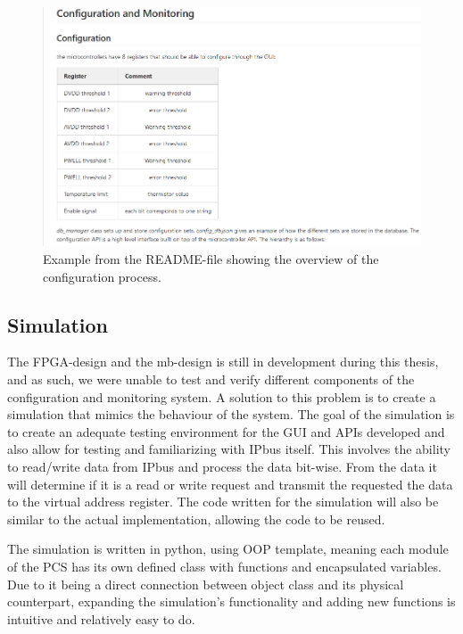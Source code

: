 \documentclass[main.tex]{subfiles}
\begin{document}
\begin{figure}[!ht]
    \centering
    \includegraphics[width=18cm]{images/README_example.png}
    \caption{Example from the README-file showing the overview of the configuration process.}
    \label{fig: readme}
\end{figure}
\FloatBarrier

\subsection{Simulation}

The FPGA-design and the \gls{mb}-design is still in development during this thesis, and as such, we were unable to test and verify different components of the configuration and monitoring system. A solution to this problem is to create a simulation that mimics the behaviour of the system. The goal of the simulation is to create an adequate testing environment for the GUI and APIs developed and also allow for testing and familiarizing with IPbus itself. This involves the ability to read/write data from IPbus and process the data bit-wise. From the data it will determine if it is a read or write request and transmit the requested the data to the virtual address register. The code written for the simulation will also be similar to the actual implementation, allowing the code to be reused.

The simulation is written in python, using OOP template, meaning each module of the PCS has its own defined class with functions and encapsulated variables. Due to it being a direct connection between object class and its physical counterpart, expanding the simulation's functionality and adding new functions is intuitive and relatively easy to do.
\end{document}
